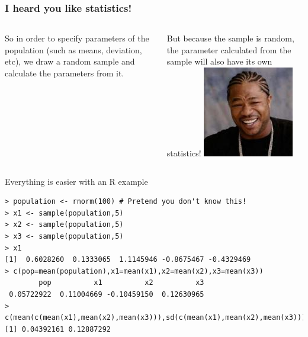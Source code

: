 \documentclass[10pt]{beamer}
\begin{document}
\begin{frame}
  \frametitle{I heard you like statistics!}
  {\small
  \begin{block}{}
    \begin{columns}
      
      So in order to specify parameters of the population (such as
      means, deviation, etc), we draw a random sample and calculate the
      parameters from it.  
      \medskip

      But because the sample is random, the parameter calculated from
      the sample will also have its own statistics!
      \includegraphics[width=.8\textwidth]{img/yodawg}      
    \end{columns}
  \end{block}
  \begin{exampleblock}{Everything is easier with an R example}
\begin{verbatim}
> population <- rnorm(100) # Pretend you don't know this!
> x1 <- sample(population,5)
> x2 <- sample(population,5)
> x3 <- sample(population,5)
> x1
[1]  0.6028260  0.1333065  1.1145946 -0.8675467 -0.4329469
> c(pop=mean(population),x1=mean(x1),x2=mean(x2),x3=mean(x3))
        pop          x1          x2          x3 
 0.05722922  0.11004669 -0.10459150  0.12630965
> c(mean(c(mean(x1),mean(x2),mean(x3))),sd(c(mean(x1),mean(x2),mean(x3))))
[1] 0.04392161 0.12887292
\end{verbatim}
  \end{exampleblock}
}
\end{frame}
\end{document}
